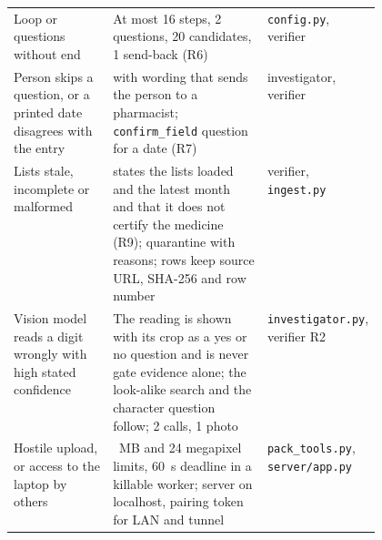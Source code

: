 \begin{table}[H]
\begin{tabularx}{\linewidth}{@{}>{\raggedright\arraybackslash}p{0.27\linewidth} >{\raggedright\arraybackslash}X >{\raggedright\arraybackslash}p{0.2\linewidth}@{}}
Loop or questions without end & At most 16 steps, 2 questions, 20 candidates, 1 send-back (R6) & \texttt{config.py}, verifier \\
Person skips a question, or a printed date disagrees with the entry & \CANTV{} with wording that sends the person to a pharmacist; \texttt{confirm\_field} question for a date (R7) & investigator, verifier \\
Lists stale, incomplete or malformed & \NLISTED{} states the lists loaded and the latest month and that it does not certify the medicine (R9); quarantine with reasons; rows keep source URL, SHA-256 and row number & verifier, \texttt{ingest.py} \\
Vision model reads a digit wrongly with high stated confidence & The reading is shown with its crop as a yes or no question and is never gate evidence alone; the look-alike search and the character question follow; 2 calls, 1 photo & \texttt{investigator.py}, verifier R2 \\
Hostile upload, or access to the laptop by others & 15~MB and 24 megapixel limits, 60~s deadline in a killable worker; server on localhost, pairing token for LAN and tunnel & \texttt{pack\_tools.py}, \texttt{server/app.py} \\
\bottomrule
\end{tabularx}
\end{table}
